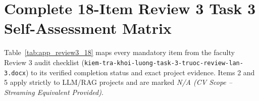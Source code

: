 \section{Complete 18-Item Review 3 Task 3 Self-Assessment Matrix}
\label{app:review3_checklist}

Table~\ref{tab:app_review3_18} maps every mandatory item from the faculty Review 3 audit checklist (\texttt{kiem-tra-khoi-luong-task-3-truoc-review-lan-3.docx}) to its verified completion status and exact project evidence. Items 2 and 5 apply strictly to LLM/RAG projects and are marked \textit{N/A (CV Scope -- Streaming Equivalent Provided)}.

